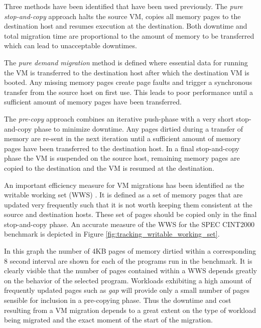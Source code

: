 Three methods have been identified that have been used previously. The \textit{pure stop-and-copy} approach halts the source VM, copies all memory pages to the destination host and resumes execution at the destination. Both downtime and total migration time are proportional to the amount of memory to be transferred which can lead to unacceptable downtimes. 

The \textit{pure demand migration} method is defined where essential data for running the VM is transferred to the destination host after which the destination VM is booted. Any missing memory pages create page faults and trigger a synchronous transfer from the source host on first use. This leads to poor performance until a sufficient amount of memory pages have been transferred. 

The \textit{pre-copy} approach combines an iterative push-phase with a very short stop-and-copy phase to minimize downtime. Any pages dirtied during a transfer of memory are re-sent in the next iteration until a sufficient amount of memory pages have been transferred to the destination host. In a final stop-and-copy phase the VM is suspended on the source host, remaining memory pages are copied to the destination and the VM is resumed at the destination. 

An important efficiency measure for VM migrations has been identified as the writable working set (WWS) \cite{clark2005live}. It is defined as a set of memory pages that are updated very frequently such that it is not worth keeping them consistent at the source and destination hosts. These set of pages should be copied only in the final stop-and-copy phase. An accurate measure of the WWS for the SPEC CINT2000 benchmark is depicted in Figure \ref{fig:tracking_writable_working_set}. 

In this graph the number of 4KB pages of memory dirtied within a corresponding 8 second interval are shown for each of the programs run in the benchmark. 
It is clearly visible that the number of pages contained within a WWS depends greatly on the behavior of the selected program. Workloads exhibiting a high amount of frequently updated pages such as \textit{gap} will provide only a small number of pages sensible for inclusion in a pre-copying phase. 
Thus the downtime and cost resulting from a VM migration depends to a great extent on the type of workload being migrated and the exact moment of the start of the migration. 



